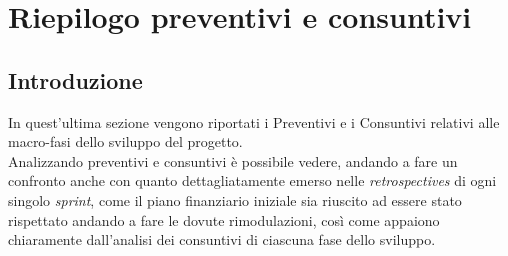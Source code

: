 \section{Riepilogo preventivi e consuntivi}
\subsection{Introduzione}
In quest'ultima sezione vengono riportati i Preventivi e i Consuntivi relativi alle macro-fasi dello sviluppo del progetto. \\
Analizzando preventivi e consuntivi è possibile vedere, andando a fare un confronto anche con quanto dettagliatamente emerso nelle \textit{retrospectives} di ogni singolo \textit{sprint}, come il piano finanziario iniziale sia riuscito ad essere stato rispettato andando a fare le dovute rimodulazioni, così come appaiono chiaramente dall'analisi dei consuntivi di ciascuna fase dello sviluppo. 
